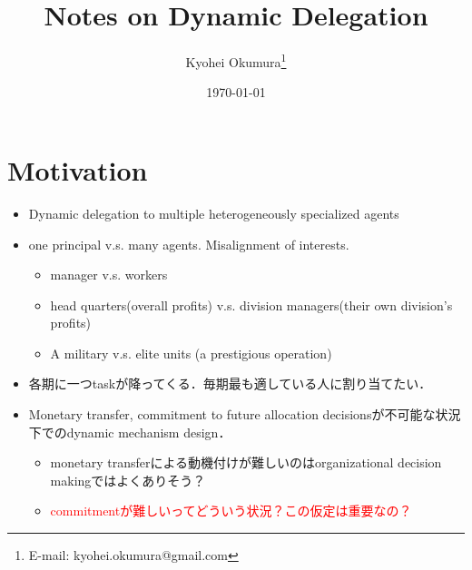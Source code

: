 \documentclass[11pt,a4paper,dvipdfmx]{article}
\newcommand{\1}{\mathbbm{1}}
\newcommand{\ocomment}[1]{{\textcolor{red}{#1}}}
\begin{document}
\title{Notes on Dynamic Delegation}
\author{Kyohei Okumura{\footnote{E-mail: kyohei.okumura@gmail.com}
}}
\date{\today}
\maketitle

\section*{Motivation}
\begin{itemize}
	\item Dynamic delegation to multiple heterogeneously specialized agents
	\item one principal v.s. many agents. Misalignment of interests.
	\begin{itemize}
		\item manager v.s. workers
		\item head quarters(overall profits) v.s. division managers(their own division's profits)
		\item A military v.s. elite units (a prestigious operation)
	\end{itemize}
	\item 各期に一つtaskが降ってくる．毎期最も適している人に割り当てたい．
	\item Monetary transfer, commitment to future allocation decisionsが不可能な状況下でのdynamic mechanism design．
	\begin{itemize}
		\item monetary transferによる動機付けが難しいのはorganizational decision makingではよくありそう？
		\item \ocomment{commitmentが難しいってどういう状況？この仮定は重要なの？}
	\end{itemize}
\end{itemize}
\end{document}
